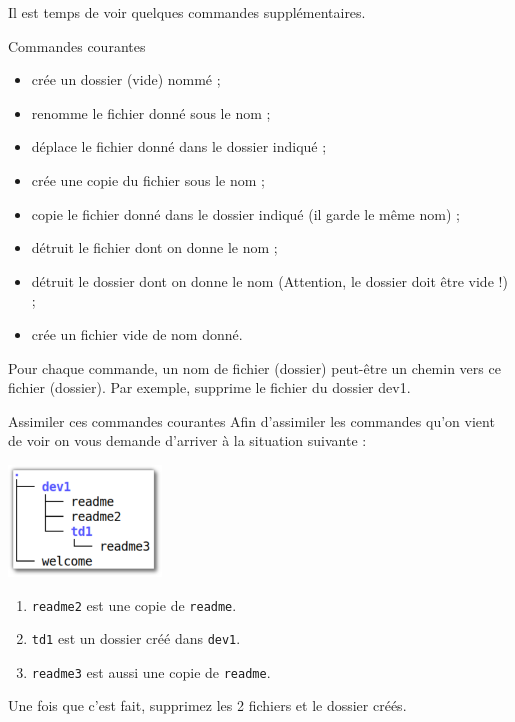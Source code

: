 \documentclass[a4paper,11pt]{style-esi/td}
\begin{document}
		\bigskip
		Il est temps de voir quelques commandes supplémentaires.

		\begin{theorie}{Commandes courantes}
			\begin{itemize}
			\item {}
				crée un dossier (vide) nommé  ;
			\item {} 
				renomme le fichier donné  sous le nom  ;
			\item {}
				déplace le fichier donné dans le dossier indiqué ;
			\item {} 
				crée une copie du fichier sous le nom  ;
			\item {} copie le fichier donné dans le dossier indiqué 
				(il garde le même nom) ;
			\item {} détruit le fichier dont on donne le nom ;
			\item {} détruit le dossier dont on donne le nom 
				(Attention, le dossier doit être vide !) ;
			\item {} crée un fichier vide de nom donné.
			\end{itemize}
		\end{theorie}

		Pour chaque commande, un nom de fichier (dossier)
		peut-être un chemin vers ce fichier (dossier).
		Par exemple,  
		supprime le fichier  du dossier {dev1}.

\newpage

		\begin{Exercice}{Assimiler ces commandes courantes}
			Afin d'assimiler les commandes qu'on vient de voir 
			on vous demande d'arriver à la situation suivante :
			\begin{center}
				\includegraphics[height=8em]{images/ex-cmd-courtantes.pdf}
			\end{center}
			\begin{enumerate}
			\item \verb|readme2| est une copie de \verb|readme|.
			\item \verb|td1| est un dossier créé dans \verb|dev1|.
			\item \verb|readme3| est aussi une copie de \verb|readme|.
			\end{enumerate}
			Une fois que c'est fait, supprimez les 2 fichiers et le dossier créés.
		\end{Exercice}
\end{document}
